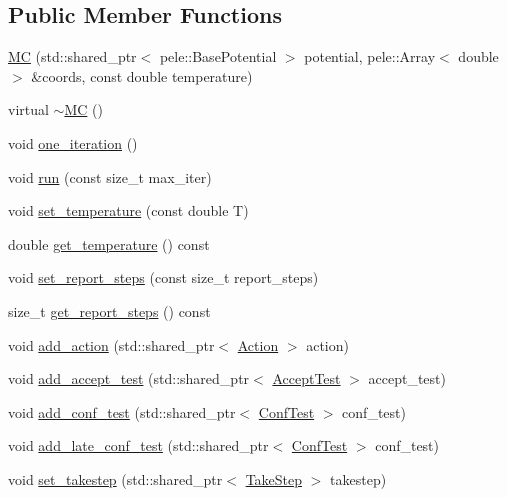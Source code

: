 \subsection*{\-Public \-Member \-Functions}
\begin{DoxyCompactItemize}
\item 
\hyperlink{classmcpele_1_1MC_ae144a06dfc924f7ae63d8b14b95a5f6b}{\-M\-C} (std\-::shared\-\_\-ptr$<$ pele\-::\-Base\-Potential $>$ potential, pele\-::\-Array$<$ double $>$ \&coords, const double temperature)
\item 
virtual \hyperlink{classmcpele_1_1MC_a4737173950c8a51437230d5d83163572}{$\sim$\-M\-C} ()
\item 
void \hyperlink{classmcpele_1_1MC_aa1528423634e13ade3fcefa525c5ed89}{one\-\_\-iteration} ()
\item 
void \hyperlink{classmcpele_1_1MC_a746de23c4d9ddad54a1e9da1dd025033}{run} (const size\-\_\-t max\-\_\-iter)
\item 
void \hyperlink{classmcpele_1_1MC_ac42e32abd801ea17353fd8fb7b23aea5}{set\-\_\-temperature} (const double \-T)
\item 
double \hyperlink{classmcpele_1_1MC_a897efd5c7a2d444811de516f740c1045}{get\-\_\-temperature} () const 
\item 
void \hyperlink{classmcpele_1_1MC_a8e7f1ab57cb3d68032c0293b09596d33}{set\-\_\-report\-\_\-steps} (const size\-\_\-t report\-\_\-steps)
\item 
size\-\_\-t \hyperlink{classmcpele_1_1MC_ac7c99322af8dc258272c3f83c1ba44d3}{get\-\_\-report\-\_\-steps} () const 
\item 
void \hyperlink{classmcpele_1_1MC_a1f490ace67644e07548ccc7a2781963f}{add\-\_\-action} (std\-::shared\-\_\-ptr$<$ \hyperlink{classmcpele_1_1Action}{\-Action} $>$ action)
\item 
void \hyperlink{classmcpele_1_1MC_a66f76a288eb6389d408792c8c21c1ff0}{add\-\_\-accept\-\_\-test} (std\-::shared\-\_\-ptr$<$ \hyperlink{classmcpele_1_1AcceptTest}{\-Accept\-Test} $>$ accept\-\_\-test)
\item 
void \hyperlink{classmcpele_1_1MC_a326495f91244c8c6761b1d783019a5c6}{add\-\_\-conf\-\_\-test} (std\-::shared\-\_\-ptr$<$ \hyperlink{classmcpele_1_1ConfTest}{\-Conf\-Test} $>$ conf\-\_\-test)
\item 
void \hyperlink{classmcpele_1_1MC_a7a9ab41eb342247e9bacea30c2b3e033}{add\-\_\-late\-\_\-conf\-\_\-test} (std\-::shared\-\_\-ptr$<$ \hyperlink{classmcpele_1_1ConfTest}{\-Conf\-Test} $>$ conf\-\_\-test)
\item 
void \hyperlink{classmcpele_1_1MC_a4a348d7cb35617b70f8ef2955712b084}{set\-\_\-takestep} (std\-::shared\-\_\-ptr$<$ \hyperlink{classmcpele_1_1TakeStep}{\-Take\-Step} $>$ takestep)

\end{DoxyCompactItemize}
